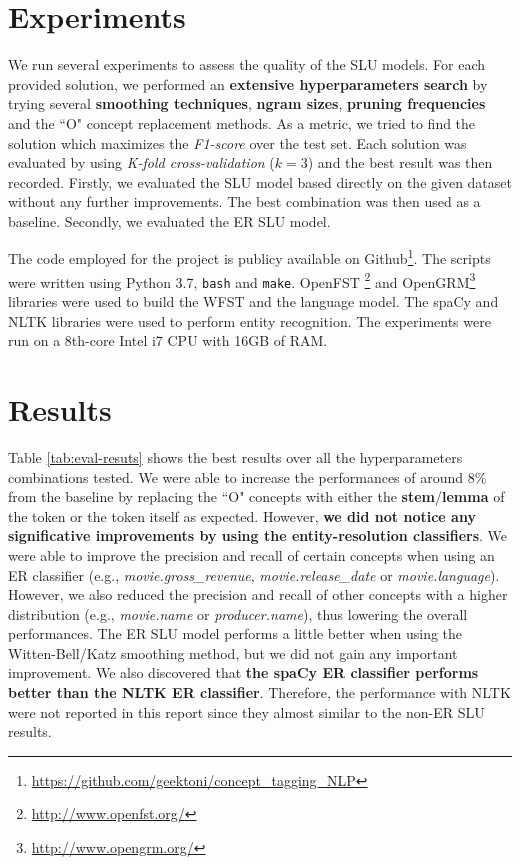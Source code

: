 \documentclass[11pt,a4paper]{article}
\begin{document}
\section{Experiments}

We run several experiments to assess the quality of 
the SLU models. For each provided solution, we performed an \textbf{extensive hyperparameters search} by trying several \textbf{smoothing techniques}, \textbf{ngram sizes}, \textbf{pruning frequencies} and the ``O" concept replacement methods. As a metric, we tried to find the solution which maximizes the \textit{F1-score} over the test set. Each solution was evaluated by using \textit{K-fold cross-validation} ($k=3$) and the best result was then recorded. Firstly, we evaluated the SLU model based directly on the given dataset without any further improvements. The best combination was then used as a baseline. Secondly, we evaluated the ER SLU model. 

The code employed for the project is publicy available on Github\footnote{\url{https://github.com/geektoni/concept\_tagging\_NLP}}. The scripts were written using Python 3.7, \texttt{bash} and \texttt{make}. OpenFST \footnote{\url{http://www.openfst.org/}} and OpenGRM\footnote{\url{http://www.opengrm.org/}} libraries were used to build the WFST and the language model. The spaCy and NLTK libraries were used to perform entity recognition.
The experiments were run on a 8th-core Intel i7 CPU with 16GB of RAM. 



\section{Results}

Table \ref{tab:eval-resuts} shows the best results over all the hyperparameters combinations tested. We were able to increase the performances of around 8\% from the baseline by replacing the ``O" concepts with either the \textbf{stem}/\textbf{lemma} of the token or the token itself as expected.
However, \textbf{we did not notice any significative improvements by using the entity-resolution classifiers}. We were able to improve the precision and recall of certain concepts when using an ER classifier (e.g., \textit{movie.gross\_revenue}, \textit{movie.release\_date} or \textit{movie.language}).
However, we also reduced the precision and recall of other concepts with a higher distribution (e.g., \textit{movie.name} or \textit{producer.name}), thus lowering the overall performances. The ER SLU model performs a little better when using the Witten-Bell/Katz smoothing method, but we did not gain any important improvement. We also discovered that \textbf{the spaCy ER classifier performs better than the NLTK ER classifier}. 
Therefore, the performance with NLTK were not reported in this report since they almost similar to the non-ER SLU results.
\end{document}
